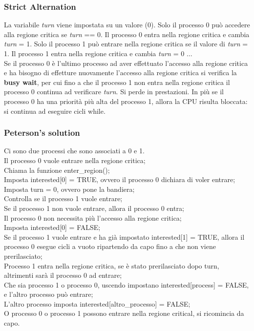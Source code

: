 \documentclass{article}
\begin{document}
\subsubsection{Strict Alternation}
La variabile \textit{turn} viene impostata su un valore (0). Solo il processo 0 può accedere alla regione critica se \textit{turn} == 0. Il processo 0 entra nella regione critica e cambia \textit{turn} = 1. Solo il processo 1 può entrare nella regione critica se il valore di \textit{turn} = 1. Il processo 1 entra nella regione critica e cambia \textit{turn} = 0 $\dots$\\

Se il processo 0 è l'ultimo processo ad aver effettuato l'accesso alla regione critica e ha bisogno di effetture nuovamente l'accesso alla regione critica si verifica la \textbf{busy wait}, per cui fino a che il processo 1 non entra nella regione critica il processo 0 continua ad verificare \textit{turn}. Si perde in prestazioni. In più se il processo 0 ha una priorità più alta del processo 1, allora la CPU risulta bloccata: si continua ad eseguire cicli while.

\subsubsection{Peterson's solution}

Ci sono due processi che sono associati a 0 e 1.\\
Il processo 0 vuole entrare nella regione critica;\\
Chiama la funzione enter\_region();\\
Imposta interested[0] = TRUE, ovvero il processo 0 dichiara di voler entrare;\\
Imposta turn = 0, ovvero pone la bandiera;\\
Controlla se il processo 1 vuole entrare;\\
Se il processo 1 non vuole entrare, allora il processo 0 entra;\\
Il processo 0 non necessita più l'accesso alla regione critica;\\
Imposta interested[0] = FALSE;\\

Se il processo 1 vuole entrare e ha già impostato interested[1] = TRUE, allora il processo 0 esegue cicli a vuoto ripartendo da capo fino a che non viene prerilasciato;\\
Processo 1 entra nella regione critica, se è stato prerilasciato dopo turn, altrimenti sarà il processo 0 ad entrare;\\
Che sia processo 1 o processo 0, uscendo impostano interested[process] = FALSE, e l'altro processo può entrare;\\
L'altro processo imposta interested[altro\_processo] =  FALSE;\\
O processo 0 o processo 1 possono entrare nella regione critical, si ricomincia da capo.\\
\end{document}
